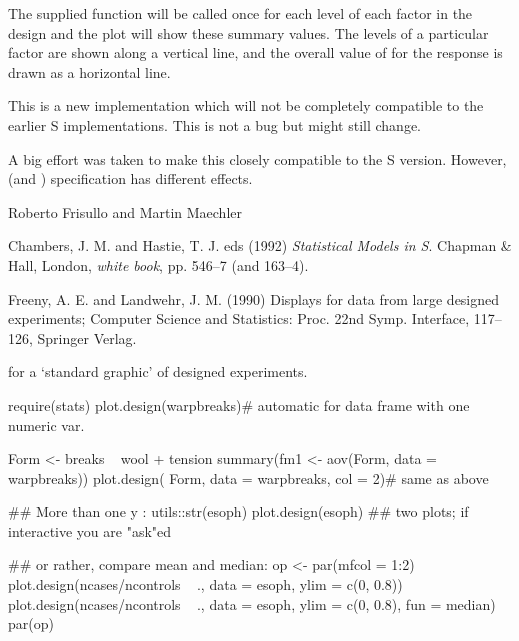%
\begin{Details}\relax
The supplied function will be called once for each level of each
factor in the design and the plot will show these summary values.  The
levels of a particular factor are shown along a vertical line, and the
overall value of  for the response is drawn as a
horizontal line.

This is a new \R{} implementation which will not be completely
compatible to the earlier S implementations.  This is not a bug but
might still change.
\end{Details}
%
\begin{Note}\relax
A big effort was taken to make this closely compatible to the S
version.  However,  (and ) specification has
different effects.
\end{Note}
%
\begin{Author}\relax
Roberto Frisullo and Martin Maechler
\end{Author}
%
\begin{References}\relax
Chambers, J. M. and Hastie, T. J. eds (1992)
\emph{Statistical Models in S}.
Chapman \& Hall, London,  \emph{white book}, pp. 546--7 (and 163--4).

Freeny, A. E. and Landwehr, J. M. (1990)
Displays for data from large designed experiments;
Computer Science and Statistics: Proc.\bsl{} 22nd Symp\bsl{}. Interface, 117--126,
Springer Verlag.
\end{References}
%
\begin{SeeAlso}\relax
{} for a `standard graphic'
of designed experiments.
\end{SeeAlso}
%
\begin{Examples}
\begin{ExampleCode}
require(stats)
plot.design(warpbreaks)# automatic for data frame with one numeric var.

Form <- breaks ~ wool + tension
summary(fm1 <- aov(Form, data = warpbreaks))
plot.design(       Form, data = warpbreaks, col = 2)# same as above

## More than one y :
utils::str(esoph)
plot.design(esoph) ## two plots; if interactive you are "ask"ed

## or rather, compare mean and median:
op <- par(mfcol = 1:2)
plot.design(ncases/ncontrols ~ ., data = esoph, ylim = c(0, 0.8))
plot.design(ncases/ncontrols ~ ., data = esoph, ylim = c(0, 0.8),
            fun = median)
par(op)
\end{ExampleCode}
\end{Examples}
